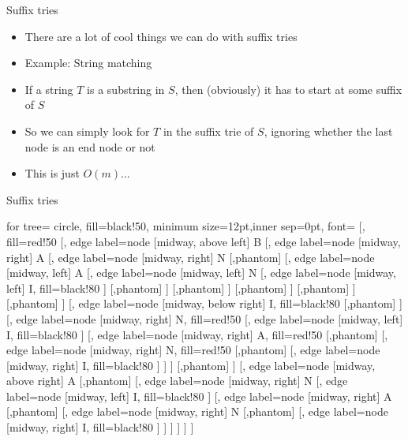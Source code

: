 \documentclass{beamer}
\begin{document}
\begin{frame}{Suffix tries}
	\begin{itemize}
		\item There are a lot of cool things we can do with suffix tries
		\vspace{10pt}
		\item Example: String matching
		\vspace{5pt}
		\item If a string $T$ is a substring in $S$, then (obviously) it has to start at some suffix of $S$
		\item So we can simply look for $T$ in the suffix trie of $S$, ignoring whether the last node is an end node or not
		\vspace{5pt}
		\item This is just $O(m)$...
	\end{itemize}
\end{frame}

\begin{frame}[fragile]{Suffix tries}
	
	\begin{center}
		\begin{forest}
			for tree={
				circle,
				fill=black!50,
				minimum size=12pt,inner sep=0pt, font=\tiny
			}
			[{}, fill=red!50
			[{}, edge label={node [midway, above left] {B}}
			[{}, edge label={node [midway, right] {A}}
			[{}, edge label={node [midway, right] {N}}
			[,phantom]
			[{}, edge label={node [midway, left] {A}}
			[{}, edge label={node [midway, left] {N}}
			[{}, edge label={node [midway, left] {I}}, fill=black!80
			]
			[,phantom]
			]
			[,phantom]
			]
			[,phantom]
			]
			[,phantom]
			]
			[,phantom]
			]
			[{}, edge label={node [midway, below right] {I}}, fill=black!80
			[,phantom]
			]
			[{}, edge label={node [midway, right] {N}}, fill=red!50
			[{}, edge label={node [midway, left] {I}}, fill=black!80
			]
			[{}, edge label={node [midway, right] {A}}, fill=red!50
			[,phantom]
			[{}, edge label={node [midway, right] {N}}, fill=red!50
			[,phantom]
			[{}, edge label={node [midway, right] {I}}, fill=black!80
			]
			]
			]
			[,phantom]
			]
			[{}, edge label={node [midway, above right] {A}}
			[,phantom]
			[{}, edge label={node [midway, right] {N}}
			[{}, edge label={node [midway, left] {I}}, fill=black!80 ]
			[{}, edge label={node [midway, right] {A}}
			[,phantom]
			[{}, edge label={node [midway, right] {N}}
			[,phantom]
			[{}, edge label={node [midway, right] {I}}, fill=black!80
			]
			]
			]
			]
			]
			]
		\end{forest}
	\end{center}
\end{frame}
\end{document}

